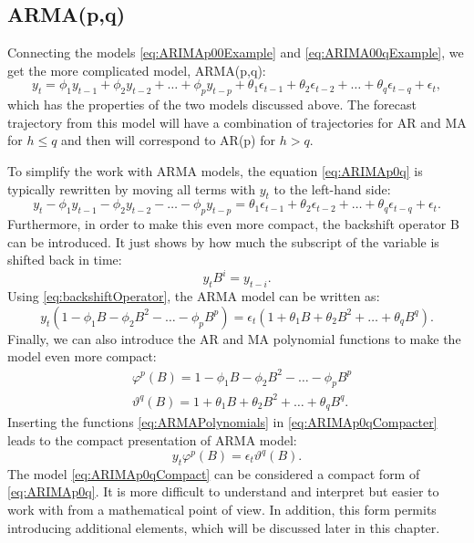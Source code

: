 \documentclass[
]{book}
\theoremstyle{definition}
\theoremstyle{definition}
\theoremstyle{definition}
\theoremstyle{definition}
\theoremstyle{remark}
\begin{document}
\hypertarget{ARMA}{%
\subsection{ARMA(p,q)}\label{ARMA}}

Connecting the models \eqref{eq:ARIMAp00Example} and \eqref{eq:ARIMA00qExample}, we get the more complicated model, ARMA(p,q):
\begin{equation}
  {y}_{t} = \phi_1 y_{t-1} + \phi_2 y_{t-2} + \dots + \phi_p y_{t-p} + \theta_1 \epsilon_{t-1} + \theta_2 \epsilon_{t-2} + \dots + \theta_q \epsilon_{t-q} + \epsilon_t ,
  \label{eq:ARIMAp0q}
\end{equation}
which has the properties of the two models discussed above. The forecast trajectory from this model will have a combination of trajectories for AR and MA for \(h \leq q\) and then will correspond to AR(p) for \(h>q\).

To simplify the work with ARMA models, the equation \eqref{eq:ARIMAp0q} is typically rewritten by moving all terms with \(y_t\) to the left-hand side:
\begin{equation}
  {y}_{t} -\phi_1 y_{t-1} -\phi_2 y_{t-2} -\dots -\phi_p y_{t-p} = \theta_1 \epsilon_{t-1} + \theta_2 \epsilon_{t-2} + \dots + \theta_q \epsilon_{t-q} + \epsilon_t .
  \label{eq:ARIMAp0qLeft}
\end{equation}
Furthermore, in order to make this even more compact, the backshift operator B can be introduced. It just shows by how much the subscript of the variable is shifted back in time:
\begin{equation}
  {y}_{t} B^i = {y}_{t-i}.
  \label{eq:backshiftOperator}
\end{equation}
Using \eqref{eq:backshiftOperator}, the ARMA model can be written as:
\begin{equation}
  {y}_{t} (1 -\phi_1 B -\phi_2 B^2 -\dots -\phi_p B^p) = \epsilon_t (1 + \theta_1 B + \theta_2 B^2 + \dots + \theta_q B^q) .
  \label{eq:ARIMAp0qCompacter}
\end{equation}
Finally, we can also introduce the AR and MA polynomial functions to make the model even more compact:
\begin{equation}
\begin{aligned}
  & \varphi^p(B) = 1 -\phi_1 B -\phi_2 B^2 -\dots -\phi_p B^p \\ 
  & \vartheta^q(B) = 1 + \theta_1 B + \theta_2 B^2 + \dots + \theta_q B^q .
\end{aligned}
  \label{eq:ARMAPolynomials}
\end{equation}
Inserting the functions \eqref{eq:ARMAPolynomials} in \eqref{eq:ARIMAp0qCompacter} leads to the compact presentation of ARMA model:
\begin{equation}
  {y}_{t} \varphi^p(B) = \epsilon_t \vartheta^q(B) .
  \label{eq:ARIMAp0qCompact}
\end{equation}
The model \eqref{eq:ARIMAp0qCompact} can be considered a compact form of \eqref{eq:ARIMAp0q}. It is more difficult to understand and interpret but easier to work with from a mathematical point of view. In addition, this form permits introducing additional elements, which will be discussed later in this chapter.
\end{document}
